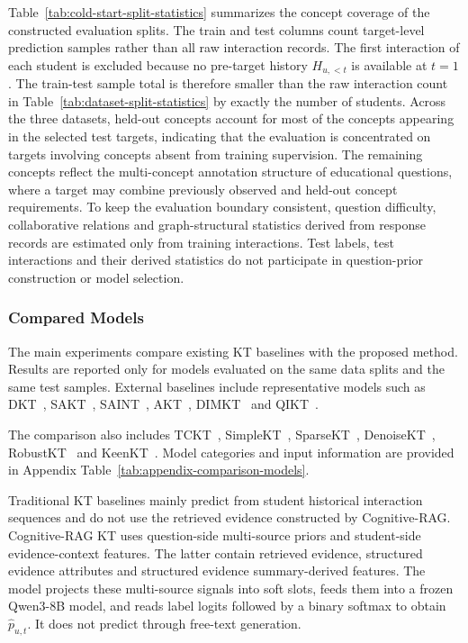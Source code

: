\documentclass[a4paper,12pt]{article}
\numberwithin{table}{section}
\begin{document}
Table~\ref{tab:cold-start-split-statistics} summarizes the concept coverage of the constructed evaluation splits. The train and test columns count target-level prediction samples rather than all raw interaction records. The first interaction of each student is excluded because no pre-target history \(H_{u,<t}\) is available at \(t=1\). The train-test sample total is therefore smaller than the raw interaction count in Table~\ref{tab:dataset-split-statistics} by exactly the number of students. Across the three datasets, held-out concepts account for most of the concepts appearing in the selected test targets, indicating that the evaluation is concentrated on targets involving concepts absent from training supervision. The remaining concepts reflect the multi-concept annotation structure of educational questions, where a target may combine previously observed and held-out concept requirements. To keep the evaluation boundary consistent, question difficulty, collaborative relations and graph-structural statistics derived from response records are estimated only from training interactions. Test labels, test interactions and their derived statistics do not participate in question-prior construction or model selection.

\subsubsection{Compared Models}

The main experiments compare existing KT baselines with the proposed method. Results are reported only for models evaluated on the same data splits and the same test samples. External baselines include representative models such as DKT~\citep{piech2015deep}, SAKT~\citep{pandey2019sakt}, SAINT~\citep{choi2020saint}, AKT~\citep{ghosh2020akt}, DIMKT~\citep{shen2022dimkt} and QIKT~\citep{chen2023qikt}.

The comparison also includes TCKT~\citep{huang2024tckt}, SimpleKT~\citep{liu2023simplekt}, SparseKT~\citep{huang2023sparsekt}, DenoiseKT~\citep{deng2025denoisekt}, RobustKT~\citep{guo2025robustkt} and KeenKT~\citep{li2026keenkt}. Model categories and input information are provided in Appendix Table~\ref{tab:appendix-comparison-models}.

Traditional KT baselines mainly predict from student historical interaction sequences and do not use the retrieved evidence constructed by Cognitive-RAG. Cognitive-RAG KT uses question-side multi-source priors and student-side evidence-context features. The latter contain retrieved evidence, structured evidence attributes and structured evidence summary-derived features. The model projects these multi-source signals into soft slots, feeds them into a frozen Qwen3-8B model\citep{yang2025qwen3,qwen2025qwen38b}, and reads label logits followed by a binary softmax to obtain \(\hat{p}_{u,t}\). It does not predict through free-text generation.
\end{document}
